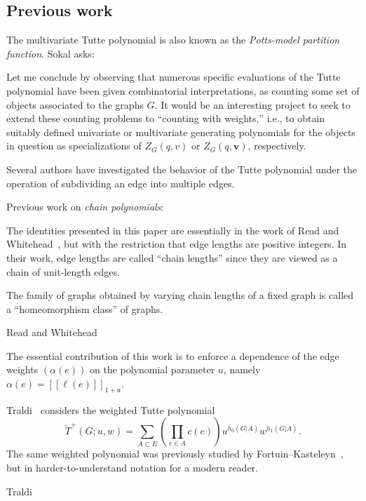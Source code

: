 \documentclass{amsart}
\theoremstyle{definition}
\newcommand{\fanalog}[2]{[\![#2]\!]_{#1}}
\begin{document}
\subsection{Previous work} 

The multivariate Tutte polynomial \cite{Sok-potts}
is also known as the {\em Potts-model partition function}.
Sokal \cite{Sok-potts} asks:
\begin{displayquote}
	Let me conclude by observing that numerous specific evaluations of the Tutte polynomial have been given combinatorial interpretations, 
	as counting some set of objects associated to the graphs $G$. 
	It would be an interesting project to seek to extend these counting problems to ``counting with weights,''
	i.e., to obtain suitably defined univariate or multivariate generating polynomials for the objects in question as specializations of 
	$Z_G(q,v)$ or $Z_G(q,\mathbf{v})$, respectively.
\end{displayquote}

Several authors have investigated the behavior of the Tutte polynomial under the operation of subdividing an edge into multiple edges.

Previous work on {\em chain polynomials}:

The identities presented in this paper are essentially in the work of Read and Whitehead~\cite{RW2}, but with the restriction that edge lengths are positive integers. 
In their work, edge lengths are called ``chain lengths'' since they are viewed as a chain of unit-length edges.

The family of graphs obtained by varying chain lengths of a fixed graph is called a ``homeomorphism class'' of graphs.

Read and Whitehead \cite{RW2}
\cites{RW1,RW2}

The essential contribution of this work is to enforce a dependence of the edge weights $(\alpha(e))$ on the polynomial parameter $u$, namely $\alpha(e) = \fanalog{1 + u}{\ell(e)}$.

Traldi~\cite{Tra1} considers the weighted Tutte polynomial
\[
	\widetilde T^+(G; u,w) = \sum_{A \subset E} \left( \prod_{e \in A} c(e) \right) u^{h_0(G|A)} w^{h_1(G|A)} .
\]
The same weighted polynomial was previously studied by Fortuin--Kasteleyn~\cite{FK}, but in harder-to-understand notation for a modern reader.



Traldi \cites{Tra1,Tra2,Tra3}
\end{document}
